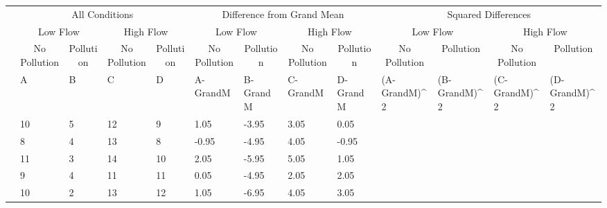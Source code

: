 \documentclass[
  letterpaper,
  DIV=11,
  numbers=noendperiod]{scrreprt}
\begin{document}
\begin{table}
\centering
\begin{tabular}{l|l|l|l|l|l|l|l|l|>{}l|>{}l|>{}l|>{}l}
\hline
\multicolumn{1}{c|}{ } & \multicolumn{4}{c|}{All Conditions} & \multicolumn{4}{c|}{Difference from Grand Mean} & \multicolumn{4}{c}{Squared Differences} \\
\cline{2-5} \cline{6-9} \cline{10-13}
\multicolumn{1}{c|}{ } & \multicolumn{2}{c|}{Low Flow} & \multicolumn{2}{c|}{High Flow} & \multicolumn{2}{c|}{Low Flow} & \multicolumn{2}{c|}{High Flow} & \multicolumn{2}{c|}{Low Flow} & \multicolumn{2}{c}{High Flow} \\
\cline{2-3} \cline{4-5} \cline{6-7} \cline{8-9} \cline{10-11} \cline{12-13}
\multicolumn{1}{c|}{ } & \multicolumn{1}{c|}{No Pollution} & \multicolumn{1}{c|}{Pollution} & \multicolumn{1}{c|}{No Pollution} & \multicolumn{1}{c|}{Pollution} & \multicolumn{1}{c|}{No Pollution} & \multicolumn{1}{c|}{Pollution} & \multicolumn{1}{c|}{No Pollution} & \multicolumn{1}{c|}{Pollution} & \multicolumn{1}{c|}{No Pollution} & \multicolumn{1}{c|}{Pollution} & \multicolumn{1}{c|}{No Pollution} & \multicolumn{1}{c}{Pollution} \\
\cline{2-2} \cline{3-3} \cline{4-4} \cline{5-5} \cline{6-6} \cline{7-7} \cline{8-8} \cline{9-9} \cline{10-10} \cline{11-11} \cline{12-12} \cline{13-13}
  & A & B & C & D & A-GrandM & B-GrandM & C-GrandM & D-GrandM & (A-GrandM)\textasciicircum{}2 & (B-GrandM)\textasciicircum{}2 & (C-GrandM)\textasciicircum{}2 & (D-GrandM)\textasciicircum{}2\\
\hline
 & 10 & 5 & 12 & 9 & 1.05 & -3.95 & 3.05 & 0.05 & \cellcolor{yellow}{1.1025} & \cellcolor{yellow}{15.6025} & \cellcolor{yellow}{9.3025} & \cellcolor{yellow}{0.0025}\\
\hline
 & 8 & 4 & 13 & 8 & -0.95 & -4.95 & 4.05 & -0.95 & \cellcolor{yellow}{0.9025} & \cellcolor{yellow}{24.5025} & \cellcolor{yellow}{16.4025} & \cellcolor{yellow}{0.9025}\\
\hline
 & 11 & 3 & 14 & 10 & 2.05 & -5.95 & 5.05 & 1.05 & \cellcolor{yellow}{4.2025} & \cellcolor{yellow}{35.4025} & \cellcolor{yellow}{25.5025} & \cellcolor{yellow}{1.1025}\\
\hline
 & 9 & 4 & 11 & 11 & 0.05 & -4.95 & 2.05 & 2.05 & \cellcolor{yellow}{0.0025} & \cellcolor{yellow}{24.5025} & \cellcolor{yellow}{4.2025} & \cellcolor{yellow}{4.2025}\\
\hline
 & 10 & 2 & 13 & 12 & 1.05 & -6.95 & 4.05 & 3.05 & \cellcolor{yellow}{1.1025} & \cellcolor{yellow}{48.3025} & \cellcolor{yellow}{16.4025} & \cellcolor{yellow}{9.3025}\\

\end{tabular}
\end{table}
\end{document}
